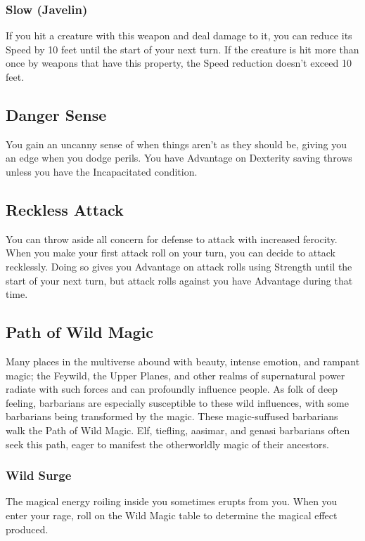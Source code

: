 \documentclass[letterpaper,openany,oneside,twocolumn]{book}
\begin{document}
\subsubsection*{Slow (Javelin)}
If you hit a creature with this weapon and deal damage to it, you can reduce its Speed by 10 feet until the start of your next turn. If the creature is hit more than once by weapons that have this property, the Speed reduction doesn't exceed 10 feet.
\subsection*{Danger Sense}
You gain an uncanny sense of when things aren't as they should be, giving you an edge when you dodge perils. You have Advantage on Dexterity saving throws unless you have the Incapacitated condition.
\subsection*{Reckless Attack}
You can throw aside all concern for defense to attack with increased ferocity. When you make your first attack roll on your turn, you can decide to attack recklessly. Doing so gives you Advantage on attack rolls using Strength until the start of your next turn, but attack rolls against you have Advantage during that time.
\subsection*{Path of Wild Magic}
Many places in the multiverse abound with beauty, intense emotion, and rampant magic; the Feywild, the Upper Planes, and other realms of supernatural power radiate with such forces and can profoundly influence people. As folk of deep feeling, barbarians are especially susceptible to these wild influences, with some barbarians being transformed by the magic. These magic-suffused barbarians walk the Path of Wild Magic. Elf, tiefling, aasimar, and genasi barbarians often seek this path, eager to manifest the otherworldly magic of their ancestors.
\subsubsection*{Wild Surge}
The magical energy roiling inside you sometimes erupts from you. When you enter your rage, roll on the Wild Magic table to determine the magical effect produced.
\end{document}

